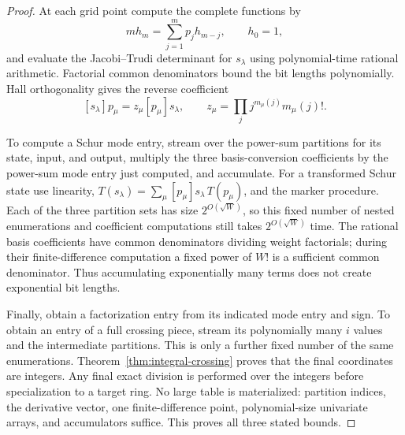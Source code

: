 \begin{proof}
At each grid point compute the complete functions by
\[
 m h_m=\sum_{j=1}^m p_jh_{m-j},\qquad h_0=1,
\]
and evaluate the Jacobi--Trudi determinant for $s_\lambda$ using
polynomial-time rational arithmetic.  Factorial common
denominators bound the bit lengths polynomially.  Hall
orthogonality gives the reverse coefficient
\[
 [s_\lambda]p_\mu=z_\mu[p_\mu]s_\lambda,
 \qquad z_\mu=\prod_jj^{m_\mu(j)}m_\mu(j)!.
\]

To compute a Schur mode entry, stream over the power-sum
partitions for its state, input, and output, multiply the three
basis-conversion coefficients by the power-sum mode entry just
computed, and accumulate.  For a transformed Schur state use
linearity, $T(s_\lambda)=\sum_\mu[p_\mu]s_\lambda\,T(p_\mu)$,
and the marker procedure.  Each of the three partition sets has
size $2^{O(\sqrt W)}$, so this fixed number of nested enumerations
and coefficient computations still takes $2^{O(\sqrt W)}$ time.
The rational basis coefficients have common denominators dividing
weight factorials; during their finite-difference computation a
fixed power of $W!$ is a sufficient common denominator.  Thus
accumulating exponentially many terms does not create
exponential bit lengths.

Finally, obtain a factorization entry from its indicated mode
entry and sign.  To obtain an entry of a full crossing piece,
stream its polynomially many $i$ values and the intermediate
partitions.  This is only a further fixed number of the same
enumerations.  Theorem~\ref{thm:integral-crossing} proves that
the final coordinates are integers.  Any final exact division
is performed over the integers before specialization to a target
ring.  No large table is materialized: partition indices, the
derivative vector, one finite-difference point, polynomial-size
univariate arrays, and accumulators suffice.  This proves all
three stated bounds.
\end{proof}
